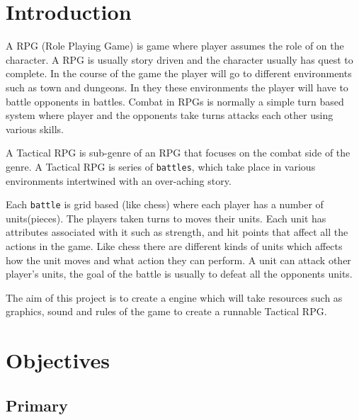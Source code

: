 %
%
%
%
%
%
%
%
%
%
%
%
%
%
%
%
%
%
%
%
%
\maketitle


\def\mytitle{A Tactical RPG Engine}
\section{Introduction}
\label{introduction}

A RPG (Role Playing Game) is game where player assumes the role of on the character. A RPG is usually story driven and the character usually has quest to complete. In the course of the game the player will go to different environments such as town and dungeons. In they these environments the player will have to battle opponents in battles. Combat in RPGs is normally a simple turn based system where player and the opponents take turns attacks each other using various skills. 

A Tactical RPG is sub-genre of an RPG that focuses on the combat side of the genre. A Tactical RPG is series of \texttt{battles}, which take place in various environments intertwined with an over-aching story.

Each \texttt{battle} is grid based (like chess) where each player has a number of units(pieces). The players taken turns to moves their units. Each unit has attributes associated with it such as strength, and hit points that affect all the actions in the game. Like chess there are different kinds of units which affects how the unit moves and what action they can perform. A unit can attack other player's units, the goal of the battle is usually to defeat all the opponents units.

The aim of this project is to create a engine which will take resources such as graphics, sound and rules of the game to create a runnable Tactical RPG.

\section{Objectives}
\label{objectives}

\subsection{Primary}
\label{primary}


